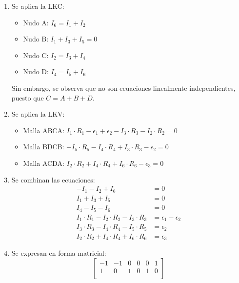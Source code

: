 \begin{example}
          \begin{enumerate}
          \item {Se aplica la LKC:}
            \begin{itemize}
            \item {Nudo A:} $I_6 = I_1 + I_2$
            \item {Nudo B:} $I_1 + I_3 + I_5 = 0$
            \item {Nudo C:} $I_2 = I_3 + I_4$
            \item {Nudo D:} $I_4 = I_5 + I_6$
            \end{itemize}
            Sin embargo, se observa que no son ecuaciones linealmente
            independientes, puesto que $C=A+B+D$.
          \item {Se aplica la LKV:}
            \begin{itemize}
            \item {Malla ABCA:}
              $I_1 \cdot R_1 - \epsilon_1 + \epsilon_2 - I_3 \cdot R_3
              - I_2 \cdot R_2 = 0$
            \item {Malla BDCB:}
              $-I_5 \cdot R_5 - I_4 \cdot R_4 + I_3 \cdot R_3 -
              \epsilon_2 = 0$
            \item {Malla ACDA:}
              $I_2 \cdot R_2 + I_4 \cdot R_4 + I_6 \cdot R_6 -
              \epsilon_3 = 0$
            \end{itemize}
          \item {Se combinan las ecuaciones:}
            \begin{align*}
              - I_1 -  I_2 + I_6  &= 0\\
              I_1 + I_3 + I_5 &= 0\\
              I_4 - I_5 - I_6 &= 0\\
              I_1 \cdot R_1 - I_2 \cdot R_2 - I_3 \cdot R_3 &= \epsilon_1 - \epsilon_2\\
              I_3 \cdot R_3 - I_4 \cdot R_4 -I_5 \cdot R_5 &= \epsilon_2\\
              I_2 \cdot R_2 + I_4 \cdot R_4 + I_6 \cdot R_6 &= \epsilon_3
            \end{align*}
          \item {Se expresan en forma matricial:}
            \begin{equation*}
              \begin{bmatrix}
                -1 & -1 & 0 & 0 & 0 & 1\\
                1 & 0 & 1 & 0 & 1 & 0\\

\end{bmatrix}
\end{equation*}
\end{enumerate}
\end{example}
